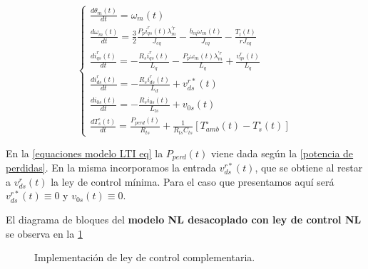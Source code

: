 \documentclass[a4paper, 10pt, onecolumn,journal]{ieeeconf}
\begin{document}
\begin{equation}
	\begin{cases}
		\frac{d \theta_m(t)}{dt} = {\omega}_m(t)\\
		\frac{d \omega_m(t)}{dt} = \frac{3}{2} \frac{P_p i^r_{qs}(t)\lambda^{'r}_m}{J_{eq}} - \frac{b_{eq}\omega_m(t)}{J_{eq}} - \frac{T_l(t)}{r J_{eq}}\\
		\frac{d i^r_{qs}(t)}{dt} = -\frac{R_s i^r_{qs}(t)}{L_q} - \frac{P_p \omega_m(t) \lambda^{'r}_m}{L_q}+ \frac{v^r_{qs}(t)}{L_q}\\
		\frac{d i^r_{ds}(t)}{dt} = -\frac{R_s i^r_{ds}(t)}{L_d}	+ v^{r*}_{ds}(t)\\
		\frac{d i_{0s}(t)}{dt} = -\frac{R_s i_{0s}(t)}{L_{ls}}	+ v_{0s}(t)\\
		\frac{d T^\circ_{s}(t)}{dt} = \frac{P_{perd}(t)}{R_{ts}} + \frac{1}{R_{ts}C_{ts}}\left[T^{\circ}_{amb}(t) - T_{s}^{\circ}(t)\right]
	\end{cases}
	\label{equaciones modelo LTI eq}
\end{equation}

En la \cref{equaciones modelo LTI eq} la $P_{perd}(t)$ viene dada según la \cref{potencia de perdidas}. En la misma incorporamos la entrada $v^{r*}_{ds}(t)$, que se obtiene al restar a  $v^r_{ds}(t)$
la ley de control mínima. Para el caso que presentamos aquí será $v^{r*}_{ds}(t) \equiv 0$ y $v_{0s}(t) \equiv0 $.


El diagrama de bloques del \textbf{modelo NL desacoplado con ley de control NL} se observa en la \cref{Implementación de ley de control complementaria}

\begin{figure}[H]
	\centering
	\begin{adjustbox}{scale=0.7,max width=\columnwidth}
	\end{adjustbox}
	\caption{Implementación de ley de control complementaria.}
	\label{Implementación de ley de control complementaria}
\end{figure}
\end{document}
